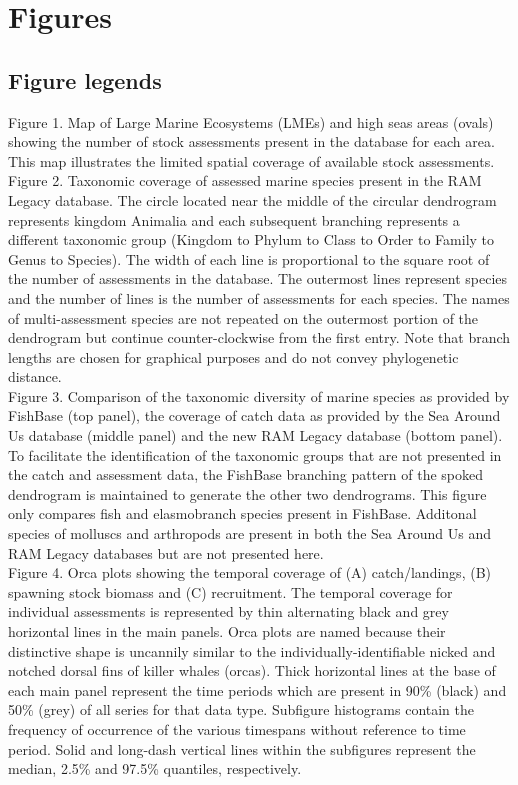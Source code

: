 \section*{Figures}
\subsection*{Figure legends}

\noindent Figure 1. Map of Large Marine Ecosystems (LMEs) and
high seas areas (ovals) showing the number of stock assessments
present in the database for each area. This map illustrates the limited
spatial coverage of available stock assessments.\\

\noindent Figure 2. Taxonomic coverage of assessed marine species present in the
RAM Legacy database. The circle located near the middle of the circular
dendrogram represents kingdom Animalia and each subsequent branching
represents a different taxonomic group (Kingdom to Phylum to Class to
Order to Family to Genus to Species). The width of each line is
proportional to the square root of the number of assessments in the
database. The outermost lines represent species and the number of
lines is the number of assessments for each species. The names of
multi-assessment species are not repeated on the outermost portion of
the dendrogram but continue counter-clockwise from the first entry.
Note that branch lengths are chosen for graphical purposes and do not
convey phylogenetic distance.\\ 

\noindent Figure 3. Comparison of the taxonomic diversity of marine
species as provided by FishBase (top panel), the coverage of catch
data as provided by the Sea Around Us database (middle panel) and the
new RAM Legacy database (bottom panel). To facilitate the
identification of the taxonomic groups that are not presented in the
catch and assessment data, the FishBase branching pattern of the
spoked dendrogram is maintained to generate the other two dendrograms.
This figure only compares fish and elasmobranch species present in
FishBase. Additonal species of molluscs and arthropods are present in
both the Sea Around Us and RAM Legacy databases but are not presented here.
\\

\noindent Figure 4. Orca plots showing the temporal coverage of (A)
catch/landings, (B) spawning stock biomass and (C) recruitment. The
temporal coverage for individual assessments is represented by thin
alternating black and grey horizontal lines in the main panels. Orca
plots are named because their distinctive shape is uncannily similar
to the individually-identifiable nicked and notched dorsal fins of
killer whales (orcas). Thick horizontal lines at the base of each main
panel represent the time periods which are present in 90\% (black) and
50\% (grey) of all series for that data type.  Subfigure histograms
contain the frequency of occurrence of the various timespans without
reference to time period. Solid and long-dash vertical lines within
the subfigures represent the median,
2.5\% and 97.5\% quantiles, respectively.\\

